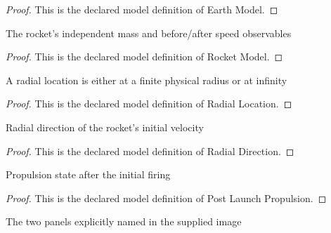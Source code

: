 \begin{proof}
  This is the declared model definition of Earth Model.
\end{proof}
\begin{definition}
  \label{def:physics:phyx-mini-0714:phyxminiproblems-problemphyxmini0714-rocketmodel}
  The rocket's independent mass and before/after speed observables
\end{definition}
\begin{proof}
  This is the declared model definition of Rocket Model.
\end{proof}
\begin{definition}
  \label{def:physics:phyx-mini-0714:phyxminiproblems-problemphyxmini0714-radiallocation}
  A radial location is either at a finite physical radius or at infinity
\end{definition}
\begin{proof}
  This is the declared model definition of Radial Location.
\end{proof}
\begin{definition}
  \label{def:physics:phyx-mini-0714:phyxminiproblems-problemphyxmini0714-radialdirection}
  Radial direction of the rocket's initial velocity
\end{definition}
\begin{proof}
  This is the declared model definition of Radial Direction.
\end{proof}
\begin{definition}
  \label{def:physics:phyx-mini-0714:phyxminiproblems-problemphyxmini0714-postlaunchpropulsion}
  Propulsion state after the initial firing
\end{definition}
\begin{proof}
  This is the declared model definition of Post Launch Propulsion.
\end{proof}
\begin{definition}
  \label{def:physics:phyx-mini-0714:phyxminiproblems-problemphyxmini0714-escapephase}
  The two panels explicitly named in the supplied image
\end{definition}
